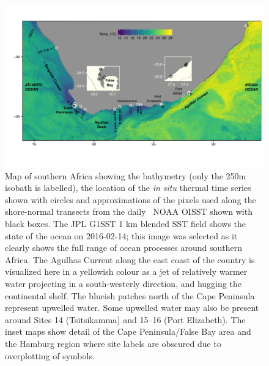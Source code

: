 \documentclass[a4paper,10pt,review]{elsarticle}
\begin{document}
\begin{figure}
\includegraphics[width=1.0\textwidth]{figure1_1km_inset_map_labeled.pdf}
\caption{Map of southern Africa showing the bathymetry (only the 250m isobath is labelled), the location of the \emph{in situ} thermal time series shown with circles and approximations of the pixels used along the shore-normal transects from the daily \degree~NOAA OISST \citep{Reynolds2007} shown with black boxes. The JPL G1SST 1 km blended SST field shows the state of the ocean on 2016-02-14; this image was selected as it clearly shows the full range of ocean processes around southern Africa. The Agulhas Current along the east coast of the country is visualized here in a yellowish colour as a jet of relatively warmer water projecting in a south-westerly direction, and hugging the continental shelf. The blueish patches north of the Cape Peninsula represent upwelled water. Some upwelled water may also be present around Sites 14 (Tsitsikamma) and 15--16 (Port Elizabeth). The inset maps show detail of the Cape Peninsula/False Bay area and the Hamburg region where site labels are obscured due to overplotting of symbols.}
\label{fig:Figure1}
\end{figure}
\end{document}
